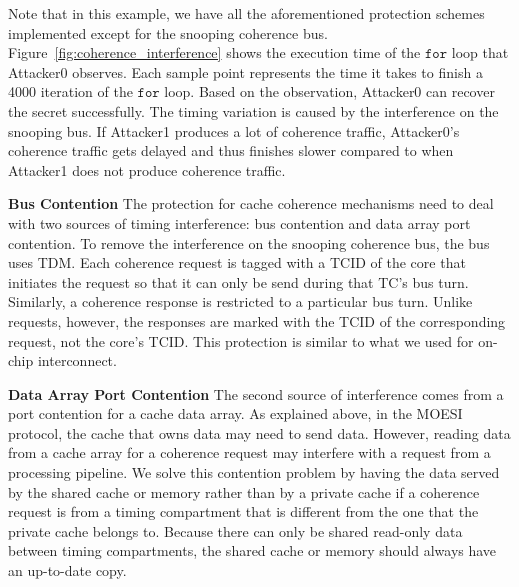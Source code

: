 Note that in this example, we have all the aforementioned protection schemes 
implemented except for the snooping coherence bus.
Figure~\ref{fig:coherence_interference} shows the execution time of the $\mathtt{for }$ 
loop that Attacker0 observes. Each
sample point represents the time it takes to finish a 4000 iteration of the $\mathtt{for }$ 
loop. Based on the observation, Attacker0
can recover the secret successfully. The timing variation is caused by the 
interference on the snooping bus. If Attacker1
produces a lot of coherence traffic, Attacker0's coherence traffic gets delayed 
and thus finishes slower compared to
when Attacker1 does not produce coherence traffic. 

{\bf Bus Contention}
The protection for cache coherence mechanisms need to deal with two sources of
timing interference: bus contention and data array port contention.
To remove the interference on the snooping coherence bus, the bus
uses TDM. Each coherence request is tagged with a TCID of the core that
initiates the request so that it can only be send during that TC's bus turn.
Similarly, a coherence response is restricted to a particular bus turn.
Unlike requests, however, the responses are marked with the TCID of the
corresponding request, not the core's TCID.
This protection is similar to what we used for on-chip interconnect. 

{\bf Data Array Port Contention}
The second source of interference comes from a port contention for a cache
data array. As explained above, in the MOESI protocol, the cache that owns 
data may need to send data. However, reading data from a cache array for
a coherence request may interfere with a request from a processing pipeline.
We solve this contention problem by having the data served by the shared
cache or memory rather than by a private cache if a
coherence request is from a timing compartment that is different from
the one that the private cache belongs to.
Because there can only be shared read-only data between timing compartments,
the shared cache or memory should always have an up-to-date copy.

